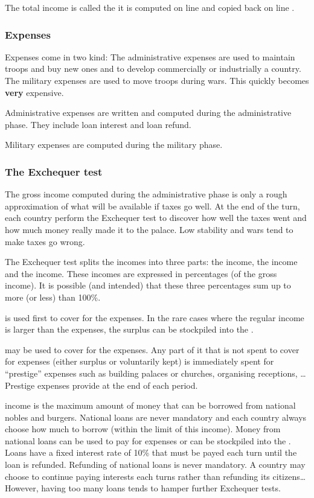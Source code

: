 \aparag The total income is called the  it is computed on
line  and copied back on line .


\subsubsection{Expenses}
\aparag Expenses come in two kind:
\bparag The administrative expenses are used to maintain troops and buy new
ones and to develop commercially or industrially a country.
\bparag The military expenses are used to move troops during wars. This
quickly becomes \textbf{very} expensive.

\aparag Administrative expenses are written and computed during the
administrative phase.
\bparag They include loan interest and loan refund.

\aparag Military expenses are computed during the military phase.


\subsubsection{The Exchequer test}
\aparag The gross income computed during the administrative phase is only a
rough approximation of what will be available if taxes go well.
\bparag At the end of the turn, each country perform the Exchequer test to
discover how well the taxes went and how much money really made it to the
palace.
\bparag Low stability and wars tend to make taxes go wrong.

\aparag The Exchequer test splits the incomes into three parts: the
 income, the  income and the  income.
\bparag These incomes are expressed in percentages (of the gross income).
\bparag It is possible (and intended) that these three percentages sum up to
more (or less) than 100\%.

 is used first to cover for the expenses.
\bparag In the rare cases where the regular income is larger than the
expenses, the surplus can be stockpiled into the \RT.

 may be used to cover for the expenses.
\bparag Any part of it that is not spent to cover for expenses (either surplus
or voluntarily kept) is immediately spent for ``prestige'' expenses such as
building palaces or churches, organising receptions, \ldots
\bparag Prestige expenses provide \VPs at the end of each period.

 income is the maximum amount of money that can be
borrowed from national nobles and burgers.
\bparag National loans are never mandatory and each country always choose how
much to borrow (within the limit of this income).
\bparag Money from national loans can be used to pay for expenses or can be
stockpiled into the \RT.
\bparag Loans have a fixed interest rate of 10\% that must be payed each turn
until the loan is refunded.
\bparag Refunding of national loans is never mandatory. A country may choose
to continue paying interests each turns rather than refunding its
citizens\ldots
\bparag However, having too many loans tends to hamper further Exchequer
tests.

